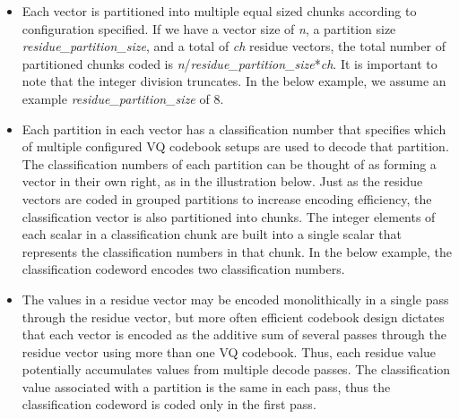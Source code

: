 \begin{itemize}
\item Each vector is partitioned into multiple equal sized chunks
according to configuration specified.  If we have a vector size of
\emph{n}, a partition size \emph{residue\_partition\_size}, and a total
of \emph{ch} residue vectors, the total number of partitioned chunks
coded is \emph{n}/\emph{residue\_partition\_size}*\emph{ch}.  It is
important to note that the integer division truncates.  In the below
example, we assume an example \emph{residue\_partition\_size} of 8.

\item Each partition in each vector has a classification number that
specifies which of multiple configured VQ codebook setups are used to
decode that partition.  The classification numbers of each partition
can be thought of as forming a vector in their own right, as in the
illustration below.  Just as the residue vectors are coded in grouped
partitions to increase encoding efficiency, the classification vector
is also partitioned into chunks.  The integer elements of each scalar
in a classification chunk are built into a single scalar that
represents the classification numbers in that chunk.  In the below
example, the classification codeword encodes two classification
numbers.

\item The values in a residue vector may be encoded monolithically in a
single pass through the residue vector, but more often efficient
codebook design dictates that each vector is encoded as the additive
sum of several passes through the residue vector using more than one
VQ codebook.  Thus, each residue value potentially accumulates values
from multiple decode passes.  The classification value associated with
a partition is the same in each pass, thus the classification codeword
is coded only in the first pass.

\end{itemize}


